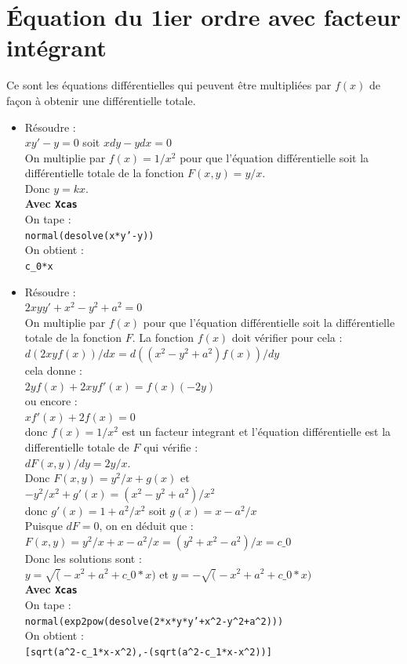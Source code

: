 \documentclass[a4paper,11pt]{book}
\begin{document}
\section{\'Equation du 1ier ordre avec facteur int\'egrant}
Ce sont les \'equations diff\'erentielles qui peuvent \^etre multipli\'ees
par $f(x)$ de fa\c{c}on \`a obtenir une diff\'erentielle totale.
\begin{itemize}
\item  R\'esoudre :\\
$xy'-y=0$ soit $xdy-ydx=0$\\
On multiplie par $f(x)=1/x^2$ pour que l'\'equation diff\'erentielle soit la
 diff\'erentielle totale de la fonction $F(x,y)=y/x$.\\
Donc $y=kx$.\\
{\bf Avec {\tt Xcas}}\\
On tape :\\
{\tt normal(desolve(x*y'-y))}\\
On obtient :\\
{\tt c\_0*x}\\

\item  R\'esoudre :\\
$2xyy'+x^2-y^2+a^2=0$\\
On multiplie par $f(x)$ pour que l'\'equation diff\'erentielle soit la
 diff\'erentielle totale de la fonction $F$. La fonction
$f(x)$ doit v\'erifier pour cela :\\
$d(2xyf(x))/dx=d((x^2-y^2+a^2)f(x))/dy$\\
cela donne :\\
$2yf(x)+2xyf'(x)=f(x)(-2y)$\\
ou encore :\\
$xf'(x)+2f(x)=0$\\
donc $f(x)=1/x^2$ est un facteur integrant et l'\'equation diff\'erentielle 
 est la differentielle totale de $F$ qui v\'erifie :\\
$dF(x,y)/dy=2y/x$.\\
 Donc $F(x,y)=y^2/x+g(x)$ et\\ 
$-y^2/x^2+g'(x)=(x^2-y^2+a^2)/x^2$\\
donc $g'(x)=1+a^2/x^2$ soit $g(x)=x-a^2/x$\\
Puisque $dF=0$, on en d\'eduit que :\\
$F(x,y)=y^2/x+x-a^2/x=(y^2+x^2-a^2)/x=c\_0$\\
Donc les solutions sont :\\
$y=\sqrt(-x^2+a^2+c\_0*x)$ et $y=-\sqrt(-x^2+a^2+c\_0*x)$\\
{\bf Avec {\tt Xcas}}\\
On tape :\\
{\tt normal(exp2pow(desolve(2*x*y*y'+x\verb|^|2-y\verb|^|2+a\verb|^|2)))}\\
On obtient :\\
{\tt [sqrt(a\verb|^|2-c\_1*x-x\verb|^|2),-(sqrt(a\verb|^|2-c\_1*x-x\verb|^|2))]}\end{itemize}
\end{document}
